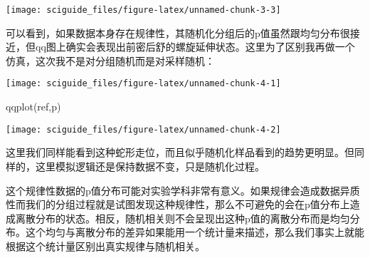 \documentclass[]{tufte-book}
\newenvironment{Shaded}{}{}
\newcommand{\AttributeTok}[1]{\textcolor[rgb]{0.49,0.56,0.16}{#1}}
\newcommand{\CommentTok}[1]{\textcolor[rgb]{0.38,0.63,0.69}{\textit{#1}}}
\newcommand{\ControlFlowTok}[1]{\textcolor[rgb]{0.00,0.44,0.13}{\textbf{#1}}}
\newcommand{\DecValTok}[1]{\textcolor[rgb]{0.25,0.63,0.44}{#1}}
\newcommand{\FunctionTok}[1]{\textcolor[rgb]{0.02,0.16,0.49}{#1}}
\newcommand{\NormalTok}[1]{#1}
\newcommand{\OtherTok}[1]{\textcolor[rgb]{0.00,0.44,0.13}{#1}}
\newcommand{\SpecialCharTok}[1]{\textcolor[rgb]{0.25,0.44,0.63}{#1}}
\begin{document}
\texttt{[image: sciguide\_files/figure-latex/unnamed-chunk-3-3]}

可以看到，如果数据本身存在规律性，其随机化分组后的p值虽然跟均匀分布很接近，但qq图上确实会表现出前密后舒的螺旋延伸状态。这里为了区别我再做一个仿真，这次我不是对分组随机而是对采样随机：

\begin{Shaded}
\end{Shaded}

\texttt{[image: sciguide\_files/figure-latex/unnamed-chunk-4-1]}

\begin{Shaded}
\begin{Highlighting}[]
\FunctionTok{qqplot}\NormalTok{(ref,p)}
\end{Highlighting}
\end{Shaded}

\texttt{[image: sciguide\_files/figure-latex/unnamed-chunk-4-2]}

这里我们同样能看到这种蛇形走位，而且似乎随机化样品看到的趋势更明显。但同样的，这里模拟逻辑还是保持数据不变，只是随机化过程。

这个规律性数据的p值分布可能对实验学科非常有意义。如果规律会造成数据异质性而我们的分组过程就是试图发现这种规律性，那么不可避免的会在p值分布上造成离散分布的状态。相反，随机相关则不会呈现出这种p值的离散分布而是均匀分布。这个均匀与离散分布的差异如果能用一个统计量来描述，那么我们事实上就能根据这个统计量区别出真实规律与随机相关。
\end{document}
